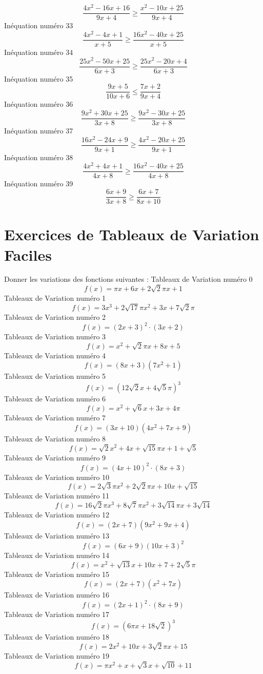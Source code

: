 \documentclass{article}
\begin{document}
\[\frac{4 x^{2} - 16 x + 16}{9 x + 4} \geq \frac{x^{2} - 10 x + 25}{9 x + 4}\]In\'equation num\'ero 33 \[\frac{4 x^{2} - 4 x + 1}{x + 5} \geq \frac{16 x^{2} - 40 x + 25}{x + 5}\]In\'equation num\'ero 34 \[\frac{25 x^{2} - 50 x + 25}{6 x + 3} \geq \frac{25 x^{2} - 20 x + 4}{6 x + 3}\]In\'equation num\'ero 35 \[\frac{9 x + 5}{10 x + 6} \leq \frac{7 x + 2}{9 x + 4}\]In\'equation num\'ero 36 \[\frac{9 x^{2} + 30 x + 25}{3 x + 8} \geq \frac{9 x^{2} - 30 x + 25}{3 x + 8}\]In\'equation num\'ero 37 \[\frac{16 x^{2} - 24 x + 9}{9 x + 1} \geq \frac{4 x^{2} - 20 x + 25}{9 x + 1}\]In\'equation num\'ero 38 \[\frac{4 x^{2} + 4 x + 1}{4 x + 8} \geq \frac{16 x^{2} - 40 x + 25}{4 x + 8}\]In\'equation num\'ero 39 \[\frac{6 x + 9}{3 x + 8} \geq \frac{6 x + 7}{8 x + 10}\]
 \section{Exercices de Tableaux de Variation Faciles}

 Donner les variations des fonctions suivantes : 
Tableaux de Variation num\'ero 0 \[f(x) = \pi x + 6 x + 2 \sqrt{2} \pi x + 1\]Tableaux de Variation num\'ero 1 \[f(x) = 3 x^{3} + 2 \sqrt{17} \pi x^{2} + 3 x + 7 \sqrt{2} \pi\]Tableaux de Variation num\'ero 2 \[f(x) = \left(2 x + 3\right)^{2} \cdot \left(3 x + 2\right)\]Tableaux de Variation num\'ero 3 \[f(x) = x^{2} + \sqrt{2} \pi x + 8 x + 5\]Tableaux de Variation num\'ero 4 \[f(x) = \left(8 x + 3\right) \left(7 x^{2} + 1\right)\]Tableaux de Variation num\'ero 5 \[f(x) = \left(12 \sqrt{2} x + 4 \sqrt{5} \pi\right)^{3}\]Tableaux de Variation num\'ero 6 \[f(x) = x^{2} + \sqrt{6} x + 3 x + 4 \pi\]Tableaux de Variation num\'ero 7 \[f(x) = \left(3 x + 10\right) \left(4 x^{2} + 7 x + 9\right)\]Tableaux de Variation num\'ero 8 \[f(x) = \sqrt{2} x^{2} + 4 x + \sqrt{15} \pi x + 1 + \sqrt{5}\]Tableaux de Variation num\'ero 9 \[f(x) = \left(4 x + 10\right)^{2} \cdot \left(8 x + 3\right)\]Tableaux de Variation num\'ero 10 \[f(x) = 2 \sqrt{3} \pi x^{2} + 2 \sqrt{2} \pi x + 10 x + \sqrt{15}\]Tableaux de Variation num\'ero 11 \[f(x) = 16 \sqrt{2} \pi x^{3} + 8 \sqrt{7} \pi x^{2} + 3 \sqrt{14} \pi x + 3 \sqrt{14}\]Tableaux de Variation num\'ero 12 \[f(x) = \left(2 x + 7\right) \left(9 x^{2} + 9 x + 4\right)\]Tableaux de Variation num\'ero 13 \[f(x) = \left(6 x + 9\right) \left(10 x + 3\right)^{2}\]Tableaux de Variation num\'ero 14 \[f(x) = x^{2} + \sqrt{13} x + 10 x + 7 + 2 \sqrt{5} \pi\]Tableaux de Variation num\'ero 15 \[f(x) = \left(2 x + 7\right) \left(x^{2} + 7 x\right)\]Tableaux de Variation num\'ero 16 \[f(x) = \left(2 x + 1\right)^{2} \cdot \left(8 x + 9\right)\]Tableaux de Variation num\'ero 17 \[f(x) = \left(6 \pi x + 18 \sqrt{2}\right)^{3}\]Tableaux de Variation num\'ero 18 \[f(x) = 2 x^{2} + 10 x + 3 \sqrt{2} \pi x + 15\]Tableaux de Variation num\'ero 19 \[f(x) = \pi x^{2} + x + \sqrt{3} x + \sqrt{10} + 11\]
\end{document}
